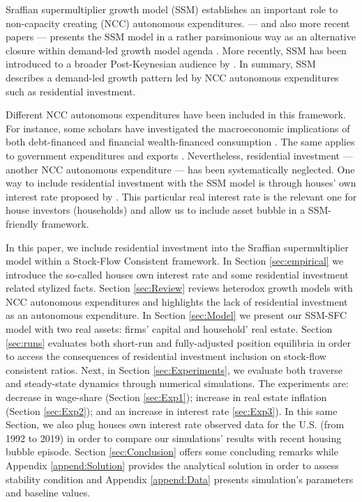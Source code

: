 \documentclass[11pt]{article}
\begin{document}
Sraffian supermultiplier growth model (SSM) establishes an important role to non-capacity creating (NCC) autonomous expenditures.
\textcite{serrano_long_1995} --- and also more recent papers \cite{freitas_growth_2015} --- presents the SSM model in a rather parsimonious way as an alternative closure within demand-led growth model agenda \cite{serrano_sraffian_2017}.
More recently, SSM has been introduced to a broader Post-Keynesian audience by \textcites{allain_tackling_2015}{lavoie_post-keynesian_2015}{lavoie_convergence_2016}.
In summary,  SSM describes a demand-led growth pattern led by NCC autonomous expenditures such as residential investment.


Different NCC autonomous expenditures have been included in this framework. 
For instance, some scholars have investigated the macroeconomic implications of both debt-financed \cites{pariboni_autonomous_2015}{fagundes_role_2017}{mandarino-2020-worker-debt} and financial wealth-financed consumption \cite{brochier_supermultiplier_2018}.
The same applies to government expenditures \cites{allain_tackling_2015}{bougrine_autonomous_2020} and exports \cite{nah_long-run_2017}.
Nevertheless, residential investment --- another NCC autonomous expenditure --- has been systematically neglected. 
One way to include residential investment with the SSM model is through houses' own interest rate proposed by \textcite{teixeira_crescimento_2015}.
This particular real interest rate is the relevant one for house investors (households) and allow us to include asset bubble in a SSM-friendly framework.



In this paper, we include residential investment into the Sraffian supermultiplier model within a Stock-Flow Consistent framework. 
In Section \ref{sec:empirical} we introduce the so-called houses own interest rate and some residential investment related stylized facts.
Section \ref{sec:Review} reviews heterodox growth models with NCC autonomous expenditures and highlights the lack of residential investment as an autonomous expenditure.
In Section \ref{sec:Model} we present our SSM-SFC model  with two real assets: firms' capital and household' real estate. 
Section \ref{sec:runs} evaluates both short-run and fully-adjusted position equilibria in order to access the consequences of residential investment inclusion on stock-flow consistent ratios.
Next, in Section \ref{sec:Experiments}, we evaluate both traverse and steady-state dynamics through numerical simulations.
The experiments are: decrease in wage-share (Section \ref{sec:Exp1}); increase in real estate inflation (Section \ref{sec:Exp2}); and an increase in interest rate \ref{sec:Exp3}).
In this same Section, we also plug houses own interest rate observed data for the U.S. (from 1992 to 2019) in order to compare our simulations' results  with recent housing bubble episode.
Section \ref{sec:Conclusion} offers some concluding remarks while Appendix \ref{append:Solution} provides the analytical solution in order to assess stability condition and Appendix \ref{append:Data} presents simulation's parameters and baseline values.
\end{document}
